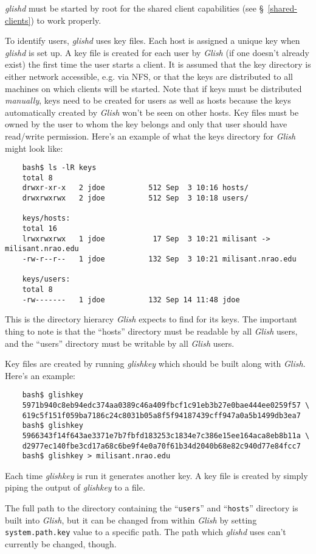 \begin{sloppy}
{\em glishd} must be started by root for the shared client capabilities
(see \S~\ref{shared-clients}) to work properly.

To identify users, {\em glishd} uses key files. Each host is assigned
a unique key when {\em glishd} is set up. A key file is created for each
user by {\em Glish} (if one doesn't already exist) the first time the user starts
a client. It is assumed that the key directory is either network accessible,
e.g. via NFS, or that the keys are distributed to all machines on which
clients will be started. Note that if keys must be distributed {\em manually},
keys need to be created for users as well as hosts because the keys
automatically created by {\em Glish} won't be seen on other hosts. Key files must
be owned by the user to whom the key belongs and only that user should have
read/write permission. Here's an example of what the keys directory
for {\em Glish}
might look like:
\begin{verbatim}
    bash$ ls -lR keys
    total 8
    drwxr-xr-x   2 jdoe          512 Sep  3 10:16 hosts/
    drwxrwxrwx   2 jdoe          512 Sep  3 10:18 users/

    keys/hosts:
    total 16
    lrwxrwxrwx   1 jdoe           17 Sep  3 10:21 milisant -> milisant.nrao.edu
    -rw-r--r--   1 jdoe          132 Sep  3 10:21 milisant.nrao.edu

    keys/users:
    total 8
    -rw-------   1 jdoe          132 Sep 14 11:48 jdoe
\end{verbatim}
This is the directory hierarcy {\em Glish} expects to find for its keys. The important
thing to note is that the ``hosts'' directory must be readable by all
{\em Glish}
users, and the ``users'' directory must be writable by all {\em Glish} users.

Key files are created by running {\em glishkey} which should be built along
with {\em Glish}. Here's an example:
\begin{verbatim}
    bash$ glishkey 
    5971b940c8eb94edc374aa0389c46a409fbcf1c91eb3b27e0bae444ee0259f57 \
    619c5f151f059ba7186c24c8031b05a8f5f94187439cff947a0a5b1499db3ea7
    bash$ glishkey 
    5966343f14f643ae3371e7b7fbfd183253c1834e7c386e15ee164aca8eb8b11a \
    d2977ec140fbe3cd17a68c6be9f4e0a70f61b34d2040b68e82c940d77e84fcc7
    bash$ glishkey > milisant.nrao.edu
\end{verbatim}
Each time {\em glishkey} is run it generates another key. A key file is
created by simply piping the output of {\em glishkey} to a file.

The full path to the directory containing the ``{\tt users}'' and ``{\tt hosts}''
directory is built into {\em Glish}, but it can be changed from within
{\em Glish}
by setting \verb+system.path.key+
\label{system-path-key}
value to a specific path. The path which {\em glishd} uses can't currently
be changed, though.


\end{sloppy}
